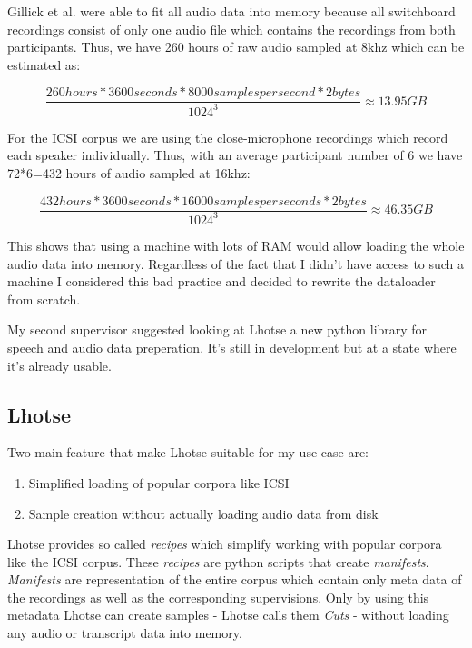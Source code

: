 \documentclass[bsc,frontabs,parskip,deptreport]{infthesis}
\begin{document}
Gillick et al. were able to fit all audio data into memory because all switchboard recordings consist of only one audio file which contains the recordings from both participants. Thus, we have 260 hours of raw audio sampled at 8khz which can be estimated as:

\[ \frac{260hours * 3600 seconds * 8000 samples per second * 2 bytes}{1024^3} \approx 13.95 GB \]

For the ICSI corpus we are using the close-microphone recordings which record each speaker individually. Thus, with an average participant number of 6 we have 72*6=432 hours of audio sampled at 16khz:

\[ \frac{432 hours * 3600 seconds * 16000 samples per seconds * 2bytes}{1024^3} \approx 46.35 GB \]

This shows that using a machine with lots of RAM would allow loading the whole audio data into memory. 
Regardless of the fact that I didn't have access to such a machine I considered this bad practice and decided to rewrite the dataloader from scratch. 

My second supervisor suggested looking at Lhotse \citep{zelasko2021lhotse} a new python library for speech and audio data preperation. It's still in development but at a state where it's already usable.

\subsection{Lhotse}
Two main feature that make Lhotse suitable for my use case are:
\begin{enumerate}
    \item Simplified loading of popular corpora like ICSI
    \item Sample creation without actually loading audio data from disk
\end{enumerate}

Lhotse provides so called \textit{recipes} which simplify working with popular corpora like the ICSI corpus.
These \textit{recipes} are python scripts that create \textit{manifests}.
\textit{Manifests} are representation of the entire corpus which contain only meta data of the recordings as well as the corresponding supervisions. 
Only by using this metadata Lhotse can create samples - Lhotse calls them \textit{Cuts} - without loading any audio or transcript data into memory. 
\end{document}
